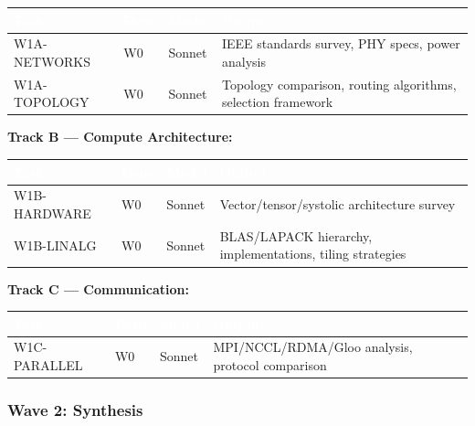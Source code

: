 \documentclass[11pt,letterpaper]{article}
\newcommand{\tableheader}[1]{\textbf{\sffamily\textcolor{white}{#1}}}
\begin{document}
\begin{center}
\begin{tabularx}{\textwidth}{L{3cm}L{2cm}C{1.5cm}X}
\toprule
{}
\tableheader{Task} & \tableheader{Deps} & \tableheader{Model} & \tableheader{Output} \\
\midrule
W1A-NETWORKS & W0 & Sonnet & IEEE standards survey, PHY specs, power analysis \\
W1A-TOPOLOGY & W0 & Sonnet & Topology comparison, routing algorithms, selection framework \\
\bottomrule
\end{tabularx}
\end{center}

\textbf{Track B --- Compute Architecture:}

\begin{center}
\begin{tabularx}{\textwidth}{L{3cm}L{2cm}C{1.5cm}X}
\toprule
{}
\tableheader{Task} & \tableheader{Deps} & \tableheader{Model} & \tableheader{Output} \\
\midrule
W1B-HARDWARE & W0 & Sonnet & Vector/tensor/systolic architecture survey \\
W1B-LINALG & W0 & Sonnet & BLAS/LAPACK hierarchy, implementations, tiling strategies \\
\bottomrule
\end{tabularx}
\end{center}

\textbf{Track C --- Communication:}

\begin{center}
\begin{tabularx}{\textwidth}{L{3cm}L{2cm}C{1.5cm}X}
\toprule
{}
\tableheader{Task} & \tableheader{Deps} & \tableheader{Model} & \tableheader{Output} \\
\midrule
W1C-PARALLEL & W0 & Sonnet & MPI/NCCL/RDMA/Gloo analysis, protocol comparison \\
\bottomrule
\end{tabularx}
\end{center}

\subsubsection{Wave 2: Synthesis}
\end{document}
